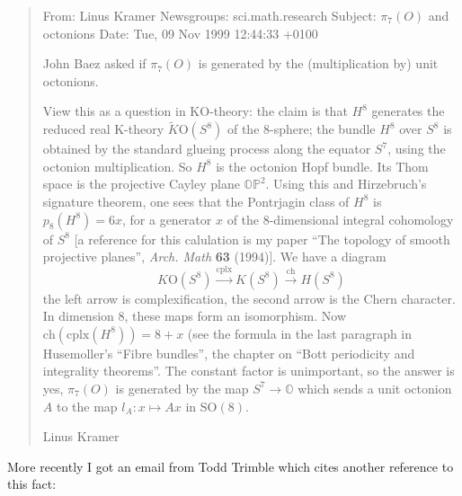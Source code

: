 \documentclass{article}
\begin{document}
\begin{quote}
From: Linus Kramer Newsgroups: sci.math.research Subject: \(\pi_7(O)\)
and octonions Date: Tue, 09 Nov 1999 12:44:33 +0100

John Baez asked if \(\pi_7(O)\) is generated by the (multiplication by)
unit octonions.

View this as a question in KO-theory: the claim is that \(H^8\)
generates the reduced real K-theory \(\tilde{K}\mathrm{O}(S^8)\) of the
8-sphere; the bundle \(H^8\) over \(S^8\) is obtained by the standard
glueing process along the equator \(S^7\), using the octonion
multiplication. So \(H^8\) is the octonion Hopf bundle. Its Thom space
is the projective Cayley plane \(\mathbb{OP}^2\). Using this and
Hirzebruch's signature theorem, one sees that the Pontrjagin class of
\(H^8\) is \(p_8(H^8)=6x\), for a generator \(x\) of the 8-dimensional
integral cohomology of \(S^8\) {[}a reference for this calulation is my
paper ``The topology of smooth projective planes'', \emph{Arch. Math}
\textbf{63} (1994){]}. We have a diagram
\[K\mathrm{O}(S^8) \xrightarrow{\mathrm{cplx}} K(S^8) \xrightarrow{\mathrm{ch}} H(S^8)\]
the left arrow is complexification, the second arrow is the Chern
character. In dimension 8, these maps form an isomorphism. Now
\(\mathrm{ch}(\mathrm{cplx}(H^8))=8+x\) (see the formula in the last
paragraph in Husemoller's ``Fibre bundles'', the chapter on ``Bott
periodicity and integrality theorems''. The constant factor is
unimportant, so the answer is yes, \(\pi_7(O)\) is generated by the map
\(S^7\to\mathbb{O}\) which sends a unit octonion \(A\) to the map
\(l_A\colon x\mapsto Ax\) in \(\mathrm{SO}(8)\).

Linus Kramer
\end{quote}

More recently I got an email from Todd Trimble which cites another
reference to this fact:
\end{document}
